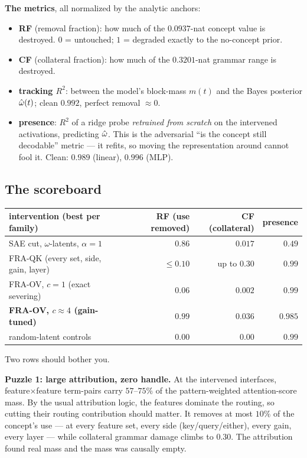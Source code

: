 \documentclass{article}
\begin{document}
\textbf{The metrics}, all normalized by the analytic anchors:
\begin{itemize}
    \item \textbf{RF} (removal fraction): how much of the $0.0937$-nat concept value is destroyed. $0$ = untouched; $1$ = degraded exactly to the no-concept prior.
    \item \textbf{CF} (collateral fraction): how much of the $0.3201$-nat grammar range is destroyed.
    \item \textbf{tracking $R^2$}: between the model's block-mass $m(t)$ and the Bayes posterior $\hat{\omega}(t)$; clean $0.992$, perfect removal $\approx 0$.
    \item \textbf{presence}: $R^2$ of a ridge probe \emph{retrained from scratch} on the intervened activations, predicting $\hat{\omega}$. This is the adversarial ``is the concept still decodable'' metric --- it refits, so moving the representation around cannot fool it. Clean: $0.989$ (linear), $0.996$ (MLP).
\end{itemize}

\subsection{The scoreboard}

\begin{center}
\begin{tabular}{lrrr}
\toprule
intervention (best per family) & RF (use removed) & CF (collateral) & presence \\
\midrule
SAE cut, $\omega$-latents, $\alpha = 1$ & $0.86$ & $0.017$ & $0.49$ \\
FRA-QK (every set, side, gain, layer) & $\le 0.10$ & up to $0.30$ & $0.99$ \\
FRA-OV, $c = 1$ (exact severing) & $0.06$ & $0.002$ & $0.99$ \\
\textbf{FRA-OV, $c \approx 4$ (gain-tuned)} & $\boldsymbol{0.99}$ & $\boldsymbol{0.036}$ & $\boldsymbol{0.985}$ \\
random-latent controls & $0.00$ & $0.00$ & $0.99$ \\
\bottomrule
\end{tabular}
\end{center}

Two rows should bother you.

\textbf{Puzzle 1: large attribution, zero handle.} At the intervened interfaces, feature$\times$feature term-pairs carry $57$--$75\%$ of the pattern-weighted attention-score mass. By the usual attribution logic, the features dominate the routing, so cutting their routing contribution should matter. It removes at most $10\%$ of the concept's use --- at every feature set, every side (key/query/either), every gain, every layer --- while collateral grammar damage climbs to $0.30$. The attribution found real mass and the mass was causally empty.
\end{document}

